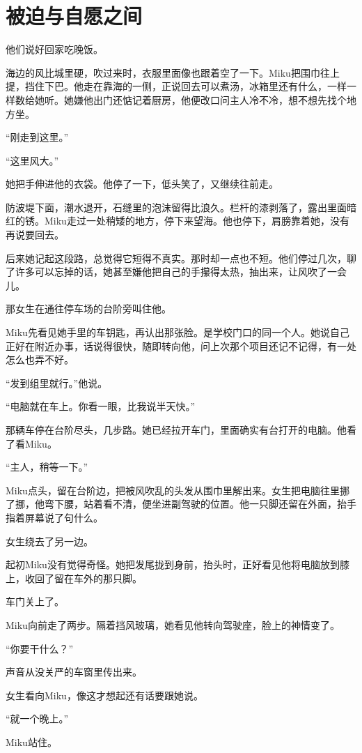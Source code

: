 \chapter{被迫与自愿之间}

他们说好回家吃晚饭。

海边的风比城里硬，吹过来时，衣服里面像也跟着空了一下。Miku把围巾往上提，挡住下巴。他走在靠海的一侧，正说回去可以煮汤，冰箱里还有什么，一样一样数给她听。她嫌他出门还惦记着厨房，他便改口问主人冷不冷，想不想先找个地方坐。

“刚走到这里。”

“这里风大。”

她把手伸进他的衣袋。他停了一下，低头笑了，又继续往前走。

防波堤下面，潮水退开，石缝里的泡沫留得比浪久。栏杆的漆剥落了，露出里面暗红的锈。Miku走过一处稍矮的地方，停下来望海。他也停下，肩膀靠着她，没有再说要回去。

后来她记起这段路，总觉得它短得不真实。那时却一点也不短。他们停过几次，聊了许多可以忘掉的话，她甚至嫌他把自己的手攥得太热，抽出来，让风吹了一会儿。

那女生在通往停车场的台阶旁叫住他。

Miku先看见她手里的车钥匙，再认出那张脸。是学校门口的同一个人。她说自己正好在附近办事，话说得很快，随即转向他，问上次那个项目还记不记得，有一处怎么也弄不好。

“发到组里就行。”他说。

“电脑就在车上。你看一眼，比我说半天快。”

那辆车停在台阶尽头，几步路。她已经拉开车门，里面确实有台打开的电脑。他看了看Miku。

“主人，稍等一下。”

Miku点头，留在台阶边，把被风吹乱的头发从围巾里解出来。女生把电脑往里挪了挪，他弯下腰，站着看不清，便坐进副驾驶的位置。他一只脚还留在外面，抬手指着屏幕说了句什么。

女生绕去了另一边。

起初Miku没有觉得奇怪。她把发尾拢到身前，抬头时，正好看见他将电脑放到膝上，收回了留在车外的那只脚。

车门关上了。

Miku向前走了两步。隔着挡风玻璃，她看见他转向驾驶座，脸上的神情变了。

“你要干什么？”

声音从没关严的车窗里传出来。

女生看向Miku，像这才想起还有话要跟她说。

“就一个晚上。”

Miku站住。

